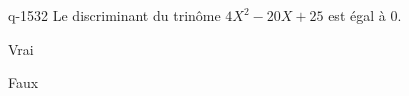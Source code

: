 \begin{truefalse}{q-1532}
Le discriminant du trinôme $4X^2-20X+25$ est égal à $0$.
\item* Vrai
\item Faux
\end{truefalse}

